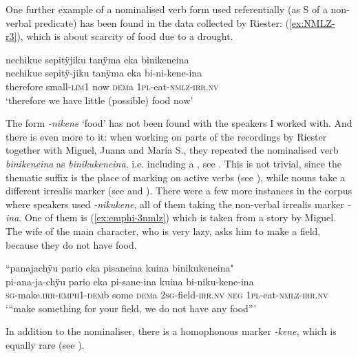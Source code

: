 One further example of a nominalised verb form used referentially (as S of a non-verbal predicate) has been found in the data collected by Riester: (\ref{ex:NMLZ-r3}), which is about scarcity of food due to a drought. 

\ea\label{ex:NMLZ-r3}
\begingl
\glpreamble nechikue sepitÿjiku tanÿma eka binikeneina\\
\gla nechikue sepitÿ-jiku tanÿma eka bi-ni-kene-ina\\
\glb therefore small-\textsc{lim}1 now \textsc{dem}a 1\textsc{pl}-eat-\textsc{nmlz}-\textsc{irr.nv}\\
\glft ‘therefore we have little (possible) food now’
\endgl
\trailingcitation{[nxx-a630101g-1.38-39]}
\xe

The form \textit{-nikene} ‘food’ has not been found with the speakers I worked with. And there is even more to it: when working on parts of the recordings by Riester together with Miguel, Juana and María S., they repeated the nominalised verb \textit{binikeneina} as \textit{binikukeneina}, i.e. including a , see . This is not trivial, since the thematic suffix is the place of  marking on active verbs (see ), while nouns take a different irrealis marker (see  and ).  %
There were a few more instances in the corpus where speakers used \textit{-nikukene}, all of them taking the non-verbal irrealis marker \textit{-ina}. One of them is (\ref{ex:emphi-3nmlz}) which is taken from a story by Miguel. The wife of the main character, who is very lazy, asks him to make a field, because they do not have food.

\ea\label{ex:emphi-3nmlz}
\begingl
\glpreamble “panajachÿu pario eka pisaneina kuina binikukeneina"\\
\gla pi-ana-ja-chÿu pario eka pi-sane-ina kuina bi-niku-kene-ina\\
\textsc{sg}-make.\textsc{irr}-\textsc{emph}1-\textsc{dem}b some \textsc{dem}a 2\textsc{sg}-field-\textsc{irr.nv} \textsc{neg} 1\textsc{pl}-eat-\textsc{nmlz}-\textsc{irr.nv}\\
\glft ‘“make something for your field, we do not have any food”’
\endgl
\trailingcitation{[mox-n110920l.015]}
\xe
{}

In addition to the nominaliser, there is a homophonous  marker \textit{-kene}, which is equally rare (see ).

